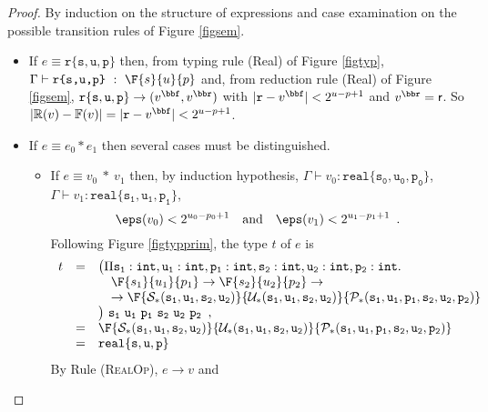 \begin{proof}
By induction on the structure of expressions
and case examination on the possible transition rules of Figure \ref{figsem}.
\begin{itemize}
\item If $e\equiv \mathtt{r\{s,u,p\}}$ then, from typing rule \textsf{(Real)} 
of Figure \ref{figtyp}, $\Gamma \vdash \texttt{r\{s,u,p\}}\ :\ \F{s}{u}{p} $ and,
from reduction rule \textsf{(Real)} of Figure \ref{figsem},
$\mathtt{r\{s,u,p\}} \rightarrow (v^\bbf,v^\bbr)$
with $|\mathtt{r}-v^\bbf|< 2^{u-p+1}$ and $v^\bbr=\mathsf{r}$.
So $|\mathbb{R}(v)-\mathbb{F}(v)|=|\mathtt{r}-v^\bbf|< 2^{u-p+1}$.
\item If $e\equiv e_0\ast e_1$ then several cases must be distinguished. 
\begin{itemize}
\item If $e\equiv v_0\ \ast\ v_1$ then, by induction hypothesis,
$\Gamma\vdash v_0:\mathtt{real\{s_0,u_0,p_0\}}$, 
$\Gamma\vdash v_1:\mathtt{real\{s_1,u_1,p_1\}}$,
\begin{equation}\label{eqproof2}
\eps(v_0)<2^{u_0-p_0+1}\quad \text{and}\quad\eps(v_1)<2^{u_1-p_1+1}\enspace. 
\end{equation}
Following Figure \ref{figtypprim}, the type $t$ of $e$ is
$$
\begin{array}{rcl}
t&=& \big(\Pi \mathtt{s_1}:\texttt{int},\mathtt{u_1}:\texttt{int}, \mathtt{p_1}:\texttt{int},
       \mathtt{s_2}:\texttt{int},\mathtt{u_2}:\texttt{int}, \mathtt{p_2}:\texttt{int}.\\
&&\quad \F{s_1}{u_1}{p_1}\rightarrow\F{s_2}{u_2}{p_2}\rightarrow \\
&&\quad \rightarrow\F{\mathcal{S}_\ast(\mathtt{s_1},\mathtt{u_1},\mathtt{s_2},\mathtt{u_2})}
{\mathcal{U}_\ast(\mathtt{s_1},\mathtt{u_1},\mathtt{s_2},\mathtt{u_2})}
{\mathcal{P}_\ast(\mathtt{s_1},\mathtt{u_1},\mathtt{p_1},\mathtt{s_2},\mathtt{u_2},\mathtt{p_2})}\\
&&\big)\ \mathtt{s_1\ u_1\ p_1\ s_2\ u_2\ p_2}\enspace ,\\
&=&\F{\mathcal{S}_\ast(\mathtt{s_1},\mathtt{u_1},\mathtt{s_2},\mathtt{u_2})}
{\mathcal{U}_\ast(\mathtt{s_1},\mathtt{u_1},\mathtt{s_2},\mathtt{u_2})}
{\mathcal{P}_\ast(\mathtt{s_1},\mathtt{u_1},\mathtt{p_1},\mathtt{s_2},\mathtt{u_2},\mathtt{p_2})}\\
&=&\mathtt{real\{s,u,p\}}
\end{array}
$$
By Rule \textsc{(RealOp)}, $e\rightarrow v$ and 

\end{itemize}
\end{itemize}
\end{proof}
